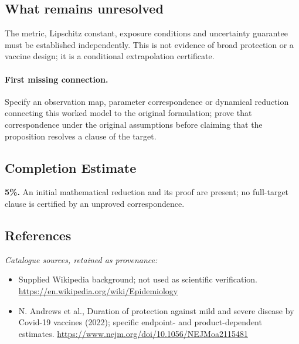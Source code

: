 \documentclass[11pt]{article}
\begin{document}
\subsection{What remains unresolved}
The metric, Lipschitz constant, exposure conditions and uncertainty guarantee must be established independently. This is not evidence of broad protection or a vaccine design; it is a conditional extrapolation certificate.
\paragraph{First missing connection.} Specify an observation map, parameter correspondence or dynamical reduction connecting this worked model to the original formulation; prove that correspondence under the original assumptions before claiming that the proposition resolves a clause of the target.
\subsection{Completion Estimate}
\textbf{5\%.} An initial mathematical reduction and its proof are present; no full-target clause is certified by an unproved correspondence.
\subsection{References}
\noindent\emph{Catalogue sources, retained as provenance:}
\begin{itemize}
\item Supplied Wikipedia background; not used as scientific verification. \url{https://en.wikipedia.org/wiki/Epidemiology}
\item N. Andrews et al., Duration of protection against mild and severe disease by Covid-19 vaccines (2022); specific endpoint- and product-dependent estimates. \url{https://www.nejm.org/doi/10.1056/NEJMoa2115481}
\end{itemize}
\end{document}
